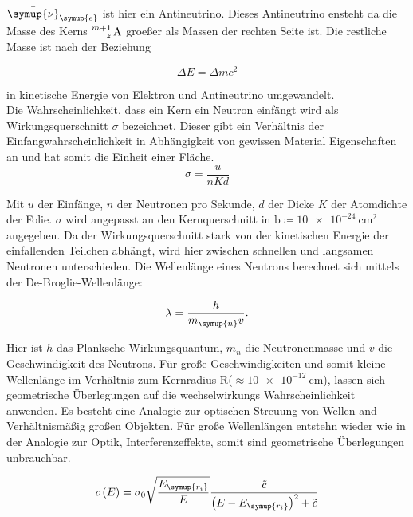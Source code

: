\noindent $\bar{\symup{\nu}}_{\symup{e}}$ ist hier ein Antineutrino. Dieses Antineutrino ensteht da die Masse des Kerns $\ce{^{m+1}_z \text{A}}$ 
groeßer als Massen der rechten Seite ist. Die restliche Masse ist nach der Beziehung

\begin{equation}
   \Delta E = \Delta m c^2 \nonumber
\end{equation}

\noindent in kinetische Energie von Elektron und Antineutrino umgewandelt.\\
Die Wahrscheinlichkeit, dass ein Kern ein Neutron einfängt wird als Wirkungsquerschnitt $\sigma$ bezeichnet. Dieser gibt ein Verhältnis der 
Einfangwahrscheinlichkeit in Abhängigkeit von gewissen Material Eigenschaften an und hat somit die Einheit einer Fläche.
\begin{equation}
   \sigma = \frac{u}{nKd} \nonumber
\end{equation}

\noindent Mit $u$ der Einfänge, $n$ der Neutronen pro Sekunde, $d$ der Dicke $K$ der Atomdichte der Folie. $\sigma$ wird angepasst an den 
Kernquerschnitt in $\si{\barn} \coloneqq \SI{10e-24}{\centi\metre\squared}$  angegeben. Da der Wirkungsquerschnitt stark von der kinetischen Energie 
der einfallenden Teilchen abhängt, wird hier zwischen schnellen und langsamen Neutronen unterschieden. Die Wellenlänge eines Neutrons 
berechnet sich mittels der De-Broglie-Wellenlänge:

\begin{equation}
   \lambda = \frac{h}{m_{\symup{n}}v}. \nonumber
\end{equation}

\noindent Hier ist $h$ das Planksche Wirkungsquantum, $m_n$ die Neutronenmasse und $v$ die Geschwindigkeit des Neutrons. Für große Geschwindigkeiten 
und somit kleine Wellenlänge im Verhältnis zum Kernradius R($\approx \SI{10e-12}{\centi\meter}$), lassen sich geometrische Überlegungen auf die 
wechselwirkungs Wahrscheinlichkeit anwenden. Es besteht eine Analogie zur optischen Streuung von Wellen and Verhältnismäßig großen Objekten. ­Für 
große Wellenlängen entstehn wieder wie in der Analogie zur Optik, Interferenzeffekte, somit sind geometrische Überlegungen unbrauchbar.

\begin{equation}
   \sigma(E) = \sigma_0 \sqrt{ \frac{E_{\symup{r_i}}}{E} } \frac{\tilde{c}}{\left( E - E_{\symup{r_i}} \right)^2 + \tilde{c}} \nonumber
\end{equation}

